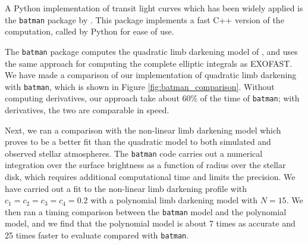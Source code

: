 \documentclass[modern]{aastex61}
\begin{document}
A Python implementation of transit light curves which has been widely applied
is the \texttt{batman} package by \citet{Kreidberg2015}.  This package
implements a fast C++ version of the computation, called by Python for
ease of use.

The \texttt{batman} package computes the quadratic limb darkening model
of \citet{MandelAgol2002}, and uses the same approach for computing
the complete elliptic integrals as EXOFAST.  We have made a comparison
of our implementation of quadratic limb darkening with \texttt{batman},
which is shown in Figure \ref{fig:batman_comparison}.  Without computing
derivatives, our approach take about 60\% of the time of \texttt{batman};
with derivatives, the two are comparable in speed.

Next, we ran a comparison with the non-linear limb darkening model which
proves to be a better fit than the quadratic model to both simulated
and observed stellar atmospheres.  The \texttt{batman} code carries out
a numerical integration over the surface brightness as a function of
radius over the stellar disk, which requires additional computational
time and limits the precision.  We have carried out a fit to the
non-linear limb darkening profile with $c_1=c_2=c_3=c_4=0.2$ with a
polynomial limb darkening model with $N=15$.  We then ran a timing
comparison between the \texttt{batman} model and the polynomial
model, and we find that the polynomial model is about 7 times
as accurate and 25 times faster to evaluate compared with \texttt{batman}.

%
%
\end{document}
